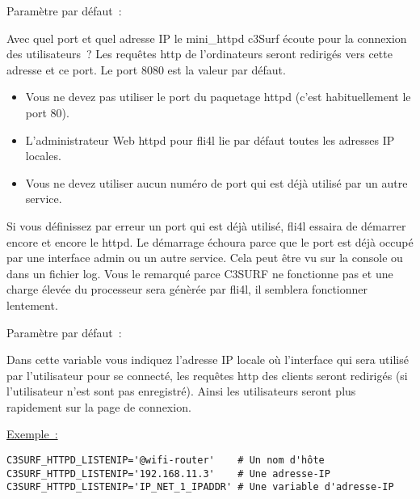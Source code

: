 \begin{itemize}
\begin{description}

  Paramètre par défaut~: 

  Avec quel port et quel adresse IP le mini\_httpd c3Surf écoute pour la connexion des
  utilisateurs~? Les requêtes http de l'ordinateurs seront redirigés vers cette adresse et
  ce port. Le port 8080 est la valeur par défaut.

  \begin{itemize}
  \item Vous ne devez pas utiliser le port du paquetage httpd (c'est habituellement le port 80).
  \item L'administrateur Web httpd pour fli4l lie par défaut toutes les adresses IP locales.
  \item Vous ne devez utiliser aucun numéro de port qui est déjà utilisé par un autre service.\\
  \end{itemize}
  Si vous définissez par erreur un port qui est déjà utilisé, fli4l essaira de démarrer
  encore et encore le httpd. Le démarrage échoura parce que le port est déjà occupé par
  une interface admin ou un autre service. Cela peut être vu sur la console ou dans un
  fichier log. Vous le remarqué parce C3SURF ne fonctionne pas et une charge élevée du
  processeur sera génèrée par fli4l, il semblera fonctionner lentement.


  Paramètre par défaut~: 

  Dans cette variable vous indiquez l'adresse IP locale où l'interface qui sera
  utilisé par l'utilisateur pour se connecté, les requêtes http des clients seront
  redirigés (si l'utilisateur n'est sont pas enregistré). Ainsi les utilisateurs
  seront plus rapidement sur la page de connexion.

\underline{Exemple~:}
\begin{example}
\begin{verbatim}
C3SURF_HTTPD_LISTENIP='@wifi-router'    # Un nom d'hôte
C3SURF_HTTPD_LISTENIP='192.168.11.3'    # Une adresse-IP
C3SURF_HTTPD_LISTENIP='IP_NET_1_IPADDR' # Une variable d'adresse-IP
\end{verbatim}
\end{example}


\end{description}
\end{itemize}
